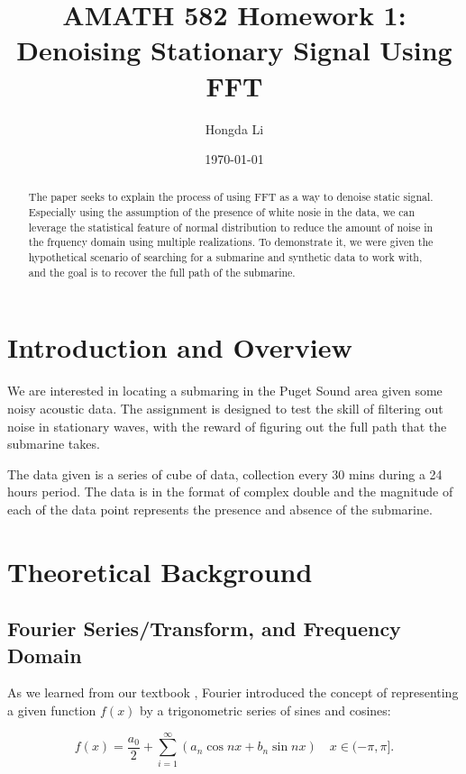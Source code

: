 \documentclass{article}
\title{AMATH 582 Homework 1: Denoising Stationary Signal Using FFT}
\author{Hongda Li}
\date{\today}
\begin{document}
\maketitle

\begin{abstract}
    The paper seeks to explain the process of using FFT as a way to denoise static signal. Especially using the assumption of the presence of white nosie in the data, we can leverage the statistical feature of normal distribution to reduce the amount of noise in the frquency domain using multiple realizations. To demonstrate it, we were given the hypothetical scenario of searching for a submarine and synthetic data to work with, and the goal is to recover the full path of the submarine. 
\end{abstract}

\section{Introduction and Overview}
\hspace{1.1em}
    We are interested in locating a submaring in the Puget Sound area given some noisy acoustic data. The assignment is designed to test the skill of filtering out noise in stationary waves, with the reward of figuring out the full path that the submarine takes. 
\par
    The data given is a series of cube of data, collection every 30 mins during a 24 hours period. The data is in the format of complex double and the magnitude of each of the data point represents the presence and absence of the submarine. 

\section{Theoretical Background}
\subsection{Fourier Series/Transform, and Frequency Domain}
    \hspace{1.1em}
    As we learned from our textbook \cite{kutz_2013}, Fourier introduced the concept of representing a given function $f(x)$ by a trigonometric series of sines and cosines:
    
    \begin{equation}
        f(x) = \frac{a_0}{2} + \sum_{i=1}^\infty \left(a_n\cos{nx} + b_n\sin{nx}\right) \quad x \in (-\pi,\pi].
        \label{eqn:fourierseries}
    \end{equation}
    
\end{document}
